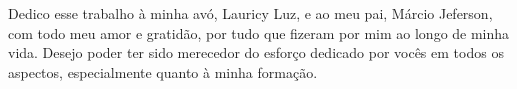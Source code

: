 %
%
%
%

\begin{dedicatoria}
\vspace*{\fill}
\begingroup
\leftskip=4cm
\noindent%
Dedico esse trabalho à minha avó, Lauricy Luz, e ao meu pai, Márcio Jeferson, com todo meu amor e gratidão, por tudo que fizeram por mim ao longo de minha vida. Desejo poder ter sido merecedor do esforço dedicado por vocês em todos os aspectos, especialmente quanto à minha formação.%
\par
\endgroup
\end{dedicatoria}

